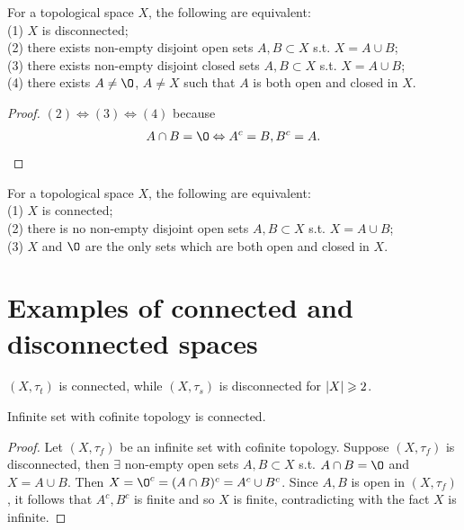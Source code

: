 \begin{proposition}{}{}
    For a topological space $X$, the following are equivalent:\\
    (1) $X$ is disconnected;\\
    (2) there exists non-empty disjoint open sets $A,B\subset X$ s.t. $X=A\cup B$;\\
    (3) there exists non-empty disjoint closed sets $A,B\subset X$ s.t. $X=A\cup B$;\\
    (4) there exists $A\neq \O$, $A\neq X$ such that $A$ is both open and closed in $X$.
\end{proposition}

\begin{proof}
    $(2)\Leftrightarrow (3)\Leftrightarrow (4)$ because
    \begin{align}
        A\cap B=\O \Leftrightarrow A^c=B, B^c=A.
    \end{align}
\end{proof}

\begin{proposition}{}{}
    For a topological space $X$, the following are equivalent:\\
    (1) $X$ is connected;\\
    (2) there is no non-empty disjoint open sets $A,B\subset X$ s.t. $X=A\cup B$;\\
    (3) $X$ and $\O$ are the only sets which are both open and closed in $X$.
\end{proposition}


\section{Examples of connected and disconnected spaces}
\begin{example}{}{}
    $(X,\tau_t)$ is connected, while $(X,\tau_s)$ is disconnected for $|X|\geqslant 2$.
\end{example}

\begin{example}{}{}
    Infinite set with cofinite topology is connected.
\end{example}
\begin{proof}
    Let $(X,\tau_f)$ be an infinite set with cofinite topology. 
    Suppose $(X,\tau_f)$ is disconnected, then 
    $\exists$ non-empty open sets $A,B\subset X$ s.t. $A\cap B=\O$ and $X=A\cup B$.
    Then $X=\O^c=(A\cap B)^c=A^c\cup B^c$. Since $A,B$ is open in $(X,\tau_f)$, it follows that $A^c,B^c$ is finite and so $X$ is finite, 
    contradicting with the fact $X$ is infinite.
\end{proof}

